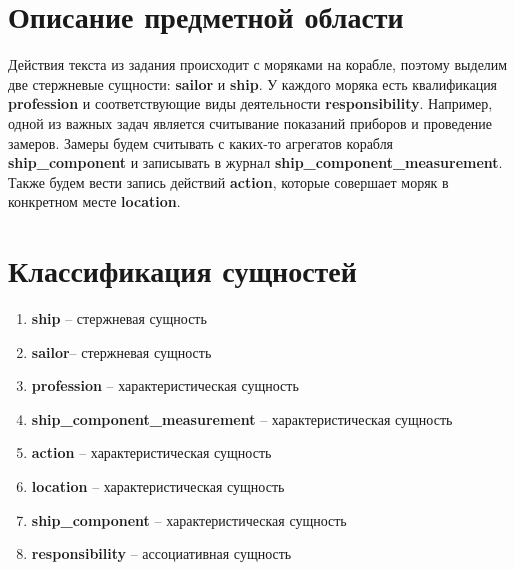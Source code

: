 \documentclass{article}
\begin{document}
\section{Описание предметной области}
Действия текста из задания происходит с моряками на корабле, поэтому выделим две стержневые сущности: \textbf{sailor} и \textbf{ship}. У каждого моряка есть квалификация \textbf{profession} и соответствующие виды деятельности \textbf{responsibility}. Например, одной из важных задач является считывание показаний приборов и проведение замеров. Замеры будем считывать с каких-то агрегатов корабля \textbf{ship\_component} и записывать в журнал \textbf{ship\_component\_measurement}. Также будем вести запись действий \textbf{action}, которые совершает моряк в конкретном месте \textbf{location}.
\section{Классификация сущностей}

\begin{enumerate}
    \item{\textbf{ship}} -- стержневая сущность
    \item{\textbf{sailor}}-- стержневая сущность
    \item{\textbf{profession}} -- характеристическая сущность
    \item{\textbf{ship\_component\_measurement}} -- характеристическая сущность
    \item{\textbf{action}} -- характеристическая сущность
    \item{\textbf{location}} -- характеристическая сущность
    \item{\textbf{ship\_component}} -- характеристическая сущность
    \item{\textbf{responsibility}} -- ассоциативная сущность
\end{enumerate}
\end{document}
